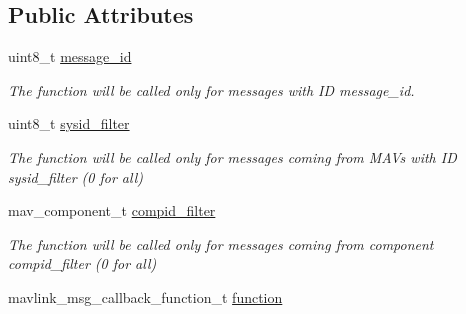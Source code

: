\subsection*{Public Attributes}
\begin{DoxyCompactItemize}
\item 
\hypertarget{structmavlink__message__handler__msg__callback__t_a56760906841dd9fe4b87377ad9b004ac}{uint8\+\_\+t \hyperlink{structmavlink__message__handler__msg__callback__t_a56760906841dd9fe4b87377ad9b004ac}{message\+\_\+id}}\label{structmavlink__message__handler__msg__callback__t_a56760906841dd9fe4b87377ad9b004ac}

\begin{DoxyCompactList}\small\item\em The function will be called only for messages with I\+D message\+\_\+id. \end{DoxyCompactList}\item 
\hypertarget{structmavlink__message__handler__msg__callback__t_a5fc641a1f1c96aa7b5ecae452430c1d2}{uint8\+\_\+t \hyperlink{structmavlink__message__handler__msg__callback__t_a5fc641a1f1c96aa7b5ecae452430c1d2}{sysid\+\_\+filter}}\label{structmavlink__message__handler__msg__callback__t_a5fc641a1f1c96aa7b5ecae452430c1d2}

\begin{DoxyCompactList}\small\item\em The function will be called only for messages coming from M\+A\+Vs with I\+D sysid\+\_\+filter (0 for all) \end{DoxyCompactList}\item 
\hypertarget{structmavlink__message__handler__msg__callback__t_a7dacafe3f72851215864962ce11c41ed}{mav\+\_\+component\+\_\+t \hyperlink{structmavlink__message__handler__msg__callback__t_a7dacafe3f72851215864962ce11c41ed}{compid\+\_\+filter}}\label{structmavlink__message__handler__msg__callback__t_a7dacafe3f72851215864962ce11c41ed}

\begin{DoxyCompactList}\small\item\em The function will be called only for messages coming from component compid\+\_\+filter (0 for all) \end{DoxyCompactList}\item 
\hypertarget{structmavlink__message__handler__msg__callback__t_afe96e343602d46139e1429da7dedfa50}{mavlink\+\_\+msg\+\_\+callback\+\_\+function\+\_\+t \hyperlink{structmavlink__message__handler__msg__callback__t_afe96e343602d46139e1429da7dedfa50}{function}}\label{structmavlink__message__handler__msg__callback__t_afe96e343602d46139e1429da7dedfa50}


\end{DoxyCompactItemize}
